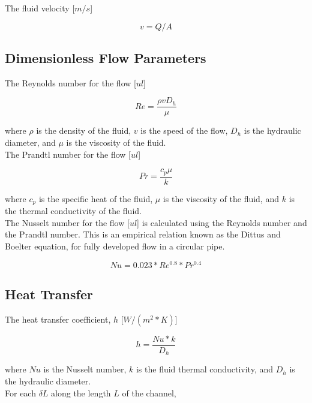 \documentclass{article}
\begin{document}
The fluid velocity [$m/s$]

\begin{equation}
	v = Q/A
\end{equation}

\subsection{Dimensionless Flow Parameters}

The Reynolds number for the flow [$ul$]

\begin{equation}
	Re = \frac{ \rho v D_h }{ \mu }
\end{equation}

where $\rho$ is the density of the fluid, $v$ is the speed of the flow, $D_h$ is the hydraulic diameter, and $\mu$ is the viscosity of the fluid. \\

The Prandtl number for the flow [$ul$]

\begin{equation}
	Pr = \frac{c_p\mu}{k}
\end{equation}

where $c_p$ is the specific heat of the fluid, $\mu$ is the viscosity of the fluid, and $k$ is the thermal conductivity of the fluid. \\

The Nusselt number for the flow [$ul$] is calculated using the Reynolds number and the Prandtl number. This is an empirical relation known as the Dittus and Boelter equation, for fully developed flow in a circular pipe.

\begin{equation}
	Nu = 0.023 * Re^{0.8} * Pr^{0.4}
\end{equation}

\subsection{Heat Transfer}

The heat transfer coefficient, $h$ [$W/(m^2*K)$]

\begin{equation}
	h = \frac{Nu*k}{D_h}
\end{equation}

where $Nu$ is the Nusselt number, $k$ is the fluid thermal conductivity, and $D_h$ is the hydraulic diameter. \\

For each $\delta L$ along the length $L$ of the channel,
\end{document}
